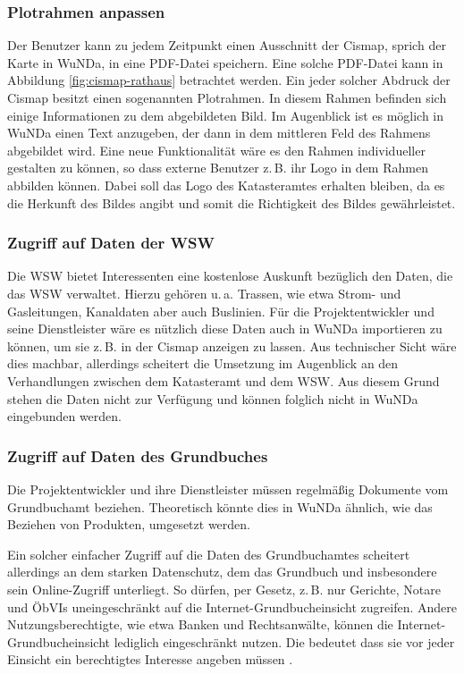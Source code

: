 \subsubsection{Plotrahmen anpassen}
Der Benutzer kann zu jedem Zeitpunkt einen Ausschnitt der Cismap, sprich der Karte in \ac{WuNDa}, in eine PDF-Datei speichern.
Eine solche PDF-Datei kann in Abbildung \vref{fig:cismap-rathaus} betrachtet werden.
Ein jeder solcher Abdruck der Cismap besitzt einen sogenannten Plotrahmen. In diesem Rahmen befinden sich einige Informationen zu dem abgebildeten Bild.
Im Augenblick ist es möglich in \ac{WuNDa} einen Text anzugeben, der dann in dem mittleren Feld des Rahmens abgebildet wird.
Eine neue Funktionalität wäre es den Rahmen individueller gestalten zu können, so dass externe Benutzer z.\,B. ihr Logo in dem Rahmen abbilden können.
Dabei soll das Logo des Katasteramtes erhalten bleiben, da es die Herkunft des Bildes angibt und somit die Richtigkeit des Bildes gewährleistet. 

\subsubsection{Zugriff auf Daten der WSW}
Die \ac{WSW} bietet Interessenten eine kostenlose Auskunft bezüglich den Daten, die das \ac{WSW} verwaltet.
Hierzu gehören u.\,a. Trassen, wie etwa Strom- und Gasleitungen, Kanaldaten aber auch Buslinien.
Für die Projektentwickler und seine Dienstleister wäre es nützlich diese Daten auch in \ac{WuNDa} importieren zu können, um sie z.\,B. in der Cismap anzeigen zu lassen.
Aus technischer Sicht wäre dies machbar, allerdings scheitert die Umsetzung im Augenblick an den Verhandlungen zwischen dem Katasteramt und dem \ac{WSW}.
Aus diesem Grund stehen die Daten nicht zur Verfügung und können folglich nicht in \ac{WuNDa} eingebunden werden.
\subsubsection{Zugriff auf Daten des Grundbuches}
Die Projektentwickler und ihre Dienstleister müssen regelmäßig Dokumente vom Grundbuchamt beziehen.
Theoretisch könnte dies in \ac{WuNDa} ähnlich, wie das Beziehen von Produkten, umgesetzt werden.

Ein solcher einfacher Zugriff auf die Daten des Grundbuchamtes scheitert allerdings an dem starken Datenschutz, dem das Grundbuch und insbesondere sein Online-Zugriff unterliegt.
So dürfen, per Gesetz, z.\,B. nur Gerichte, Notare und \acp{ÖbVI} uneingeschränkt auf die Internet-Grundbucheinsicht zugreifen.
Andere Nutzungsberechtigte, wie etwa Banken und Rechtsanwälte, können die Internet-Grundbucheinsicht lediglich eingeschränkt nutzen.
Die bedeutet dass sie vor jeder Einsicht ein berechtigtes Interesse angeben müssen \autocite[vgl.][]{justiz-grundbucheinsicht}.


